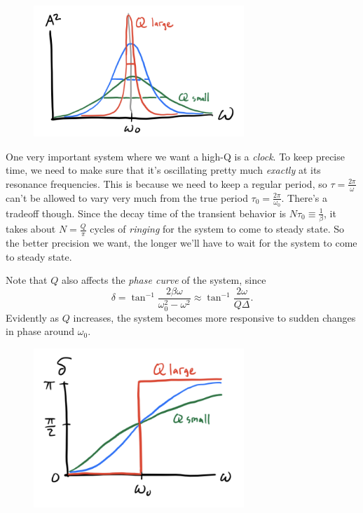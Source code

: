 \documentclass[
  letterpaper,
  DIV=11,
  numbers=noendperiod]{scrreprt}
\begin{document}
\begin{figure}

{\centering \includegraphics[width=3.125in,height=\textheight]{classical-mechanics/./resources/image-20230215154645401.png}

}

\end{figure}

One very important system where we want a high-Q is a \emph{clock}. To
keep precise time, we need to make sure that it's oscillating pretty
much \emph{exactly} at its resonance frequencies. This is because we
need to keep a regular period, so \(\tau = \frac{2\pi}{\omega}\) can't
be allowed to vary very much from the true period
\(\tau_0 = \frac{2\pi}{\omega_0}\). There's a tradeoff though. Since the
decay time of the transient behavior is
\(N\tau_0 \equiv \frac{1}{\beta}\), it takes about \(N=\frac{Q}{\pi}\)
cycles of \emph{ringing} for the system to come to steady state. So the
better precision we want, the longer we'll have to wait for the system
to come to steady state.

Note that \(Q\) also affects the \emph{phase curve} of the system, since
\[
\delta = \tan^{-1} \frac{2\beta\omega}{\omega_0^2-\omega^2} \approx \tan^{-1} \frac{2\omega}{Q\Delta}.
\] Evidently as \(Q\) increases, the system becomes more responsive to
sudden changes in phase around \(\omega_0\).

\begin{figure}

{\centering \includegraphics[width=3.125in,height=\textheight]{classical-mechanics/./resources/image-20230215160032343.png}

}

\end{figure}
\end{document}
